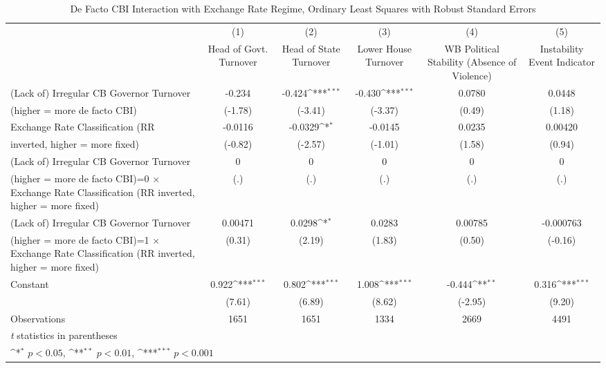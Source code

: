 \begin{table}[htbp]\centering
\def\sym#1{\ifmmode^{#1}\else\(^{#1}\)\fi}
\caption{De Facto CBI Interaction with Exchange Rate Regime, Ordinary Least Squares with Robust Standard Errors \label{imultIndOLSDF}}
\begin{tabular}{l*{5}{c}}
\toprule
                                        &\multicolumn{1}{c}{(1)}&\multicolumn{1}{c}{(2)}&\multicolumn{1}{c}{(3)}&\multicolumn{1}{c}{(4)}&\multicolumn{1}{c}{(5)}\\
                                        &\multicolumn{1}{c}{Head of Govt. Turnover}&\multicolumn{1}{c}{Head of State Turnover}&\multicolumn{1}{c}{Lower House Turnover}&\multicolumn{1}{c}{WB Political Stability (Absence of Violence)}&\multicolumn{1}{c}{Instability Event Indicator}\\
\midrule
(Lack of) Irregular CB Governor Turnover&-0.234         &-0.424\sym{***}&-0.430\sym{***}&0.0780         &0.0448         \\
(higher = more de facto CBI)            &(-1.78)         &(-3.41)         &(-3.37)         &(0.49)         &(1.18)         \\
\addlinespace
Exchange Rate Classification (RR        &-0.0116         &-0.0329\sym{*}  &-0.0145         &0.0235         &0.00420         \\
inverted, higher = more fixed)          &(-0.82)         &(-2.57)         &(-1.01)         &(1.58)         &(0.94)         \\
\addlinespace
(Lack of) Irregular CB Governor Turnover&    0         &    0         &    0         &    0         &    0         \\
(higher = more de facto CBI)=0 $\times$ Exchange Rate Classification (RR inverted, higher = more fixed)&  (.)         &  (.)         &  (.)         &  (.)         &  (.)         \\
\addlinespace
(Lack of) Irregular CB Governor Turnover&0.00471         &0.0298\sym{*}  &0.0283         &0.00785         &-0.000763         \\
(higher = more de facto CBI)=1 $\times$ Exchange Rate Classification (RR inverted, higher = more fixed)&(0.31)         &(2.19)         &(1.83)         &(0.50)         &(-0.16)         \\
\addlinespace
Constant                                &0.922\sym{***}&0.802\sym{***}&1.008\sym{***}&-0.444\sym{**} &0.316\sym{***}\\
                                        &(7.61)         &(6.89)         &(8.62)         &(-2.95)         &(9.20)         \\
\midrule
Observations                            & 1651         & 1651         & 1334         & 2669         & 4491         \\
\bottomrule
\multicolumn{6}{l}{\footnotesize \textit{t} statistics in parentheses}\\
\multicolumn{6}{l}{\footnotesize \sym{*} \(p<0.05\), \sym{**} \(p<0.01\), \sym{***} \(p<0.001\)}\\
\end{tabular}
\end{table}
